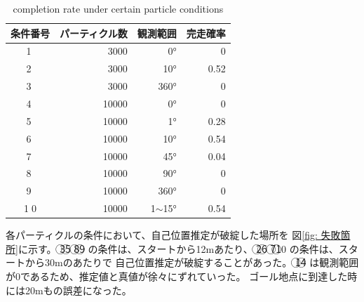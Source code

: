 \documentclass{jarticle}
\begin{document}
\begin{table}[htbp]
  \caption{completion rate under certain particle conditions}
  \label{table:完走率}
  \begin{tabular}{|c|r|r|r|} \hline
  条件番号 & パーティクル数 & 観測範囲  & 完走確率 \\ \hline \hline
  \textcircled{\scriptsize 1} & 3000 & 0° & 0 \\ \hline
  \textcircled{\scriptsize 2} & 3000 & 10° & 0.52 \\ \hline
  \textcircled{\scriptsize 3} & 3000 & 360° & 0 \\ \hline
  \textcircled{\scriptsize 4} & 10000 & 0° & 0 \\ \hline
  \textcircled{\scriptsize 5} & 10000 & 1° & 0.28 \\ \hline
  \textcircled{\scriptsize 6} & 10000 & 10° & 0.54 \\ \hline
  \textcircled{\scriptsize 7} & 10000 & 45° & 0.04 \\ \hline
  \textcircled{\scriptsize 8} & 10000 & 90° & 0 \\ \hline
  \textcircled{\scriptsize 9} & 10000 & 360° & 0 \\ \hline
  \textcircled{\scriptsize 10} & 10000 & 1$\sim$15° & 0.54 \\ \hline
  \end{tabular}
\end{table}


各パーティクルの条件において、自己位置推定が破綻した場所を
図\ref{fig: 失敗箇所}に示す。
\textcircled{\scriptsize 3}\textcircled{\scriptsize 5}\noindent
\textcircled{\scriptsize 8}\textcircled{\scriptsize 9}\noindent
の条件は、スタートから12mあたり、
\textcircled{\scriptsize 2}\textcircled{\scriptsize 6}\noindent
\textcircled{\scriptsize 7}\textcircled{\scriptsize 10}\noindent
の条件は、スタートから30mのあたりで
自己位置推定が破綻することがあった。
\textcircled{\scriptsize 1}\textcircled{\scriptsize 4}\noindent
は観測範囲が0であるため、推定値と真値が徐々にずれていった。
ゴール地点に到達した時には20mもの誤差になった。
\end{document}
